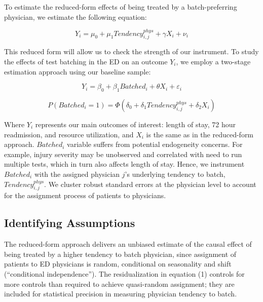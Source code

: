 \documentclass[,,nonblindrev]{informs}
\begin{document}
To estimate the reduced-form effects of being treated by a
batch-preferring physician, we estimate the following equation:

\begin{equation}
Y_i = \mu_0 + \mu_1 Tendency_{i,j}^{phys} + \gamma X_i + \nu_i
\end{equation}

This reduced form will allow us to check the strength of our instrument.
To study the effects of test batching in the ED on an outcome \(Y_i\),
we employ a two-stage estimation approach using our baseline sample:

\begin{equation}
Y_i = \beta_0 + \beta_1 Batched_i + \theta X_i + \varepsilon_i
\end{equation}

\begin{equation}
P(Batched_i = 1) = \Phi(\delta_0 + \delta_1 Tendency_{i,j}^{phys} + \delta_2 X_i)
\end{equation}

Where \(Y_i\) represents our main outcomes of interest: length of stay,
72 hour readmission, and resource utilization, and \(X_i\) is the same
as in the reduced-form approach. \(Batched_i\) variable suffers from
potential endogeneity concerns. For example, injury severity may be
unobserved and correlated with need to run multiple tests, which in turn
also affects length of stay. Hence, we instrument \(Batched_i\) with the
assigned physician \(j\)'s underlying tendency to batch,
\(Tendency_{i,j}^{phys}\). We cluster robust standard errors at the
physician level to account for the assignment process of patients to
physicians.

\hypertarget{identifying-assumptions}{%
\subsection{Identifying Assumptions}\label{identifying-assumptions}}

The reduced-form approach delivers an unbiased estimate of the causal
effect of being treated by a higher tendency to batch physician, since
assignment of patients to ED physicians is random, conditional on
seasonality and shift (``conditional independence''). The
residualization in equation (1) controls for more controls than required
to achieve quasi-random assignment; they are included for statistical
precision in measuring physician tendency to batch.
\end{document}
